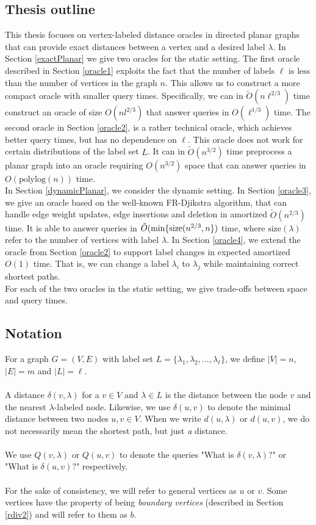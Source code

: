 \subsection{Thesis outline}
This thesis focuses on vertex-labeled distance oracles in directed planar graphs that can provide
exact distances between a vertex and a desired label $\lambda$. In Section \ref{exactPlanar} we
give two oracles for the static setting. The first oracle described in Section \ref{oracle1}
exploits the fact that
the number of labels $\ell$ is less than the number of vertices in the graph $n$. This
allows us to construct a more compact oracle with smaller query times. Specifically, we
can in $\tilde{O}(n\ell^{2/3})$ time construct an oracle of size $O(nl^{2/3})$ that answer queries in
$O(\ell^{1/3})$ time. The second oracle
in Section \ref{oracle2}, is a rather technical oracle, which achieves better query times, but has no dependence
on $\ell$. This oracle does not work for certain distributions of the label set $L$. It can
in $\tilde{O}(n^{3/2})$ time preprocess a planar graph into an oracle requiring $O(n^{3/2})$
space that can answer queries in $O(\text{polylog}(n))$ time. \\
In Section \ref{dynamicPlanar}, we consider the dynamic setting. In Section
\ref{oracle3}, we give an oracle based on the well-known FR-Djikstra algorithm, that can handle edge
weight updates, edge insertions and deletion in amortized $\tilde{O}(n^{2/3})$ time. It
is able to answer queries in $\tilde{O}(\min\{\text{size}(\label)n^{2/3}, n\})$ time, where
  $\text{size}(\lambda)$ refer to the number of vertices with label $\lambda$. In Section
  \ref{oracle4}, we extend the oracle from Section \ref{oracle2} to support label
changes in expected amortized $O(1)$ time. That is, we can change a label $\lambda_i$ to
$\lambda_j$ while maintaining correct shortest paths. \\
For each of the two oracles in the static setting, we give trade-offs between space and
query times.

\subsection{Notation}\label{notation}
For a graph $G=(V,E)$ with label set $L=\{\lambda_1, \lambda_2, \dots, \lambda_\ell\}$,
we define $|V|=n$, $|E|=m$ and $|L|=\ell$. \\
\\
A distance $\delta(v,\lambda)$ for a $v\in V$ and $\lambda\in L$ is the distance between
the node $v$ and the nearest $\lambda$-labeled node. Likewise, we use $\delta(u,v)$ to denote
the minimal distance between two nodes $u,v\in V$. When we write $d(u,\lambda)$ or
$d(u,v)$, we do not necessarily mean the shortest path, but just \textit{a} distance. \\
\\
We use $Q(v,\lambda)$ or $Q(u,v)$ to denote the queries "What is $\delta(v,\lambda)$?" or
"What is $\delta(u,v)$?" respectively. \\
\\
For the sake of consistency, we will refer to general vertices as $u$ or $v$. Some
vertices have the property of being \textit{boundary vertices} (described in Section
\ref{rdiv2}) and will refer to them as $b$.
